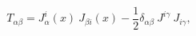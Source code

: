 \begin{equation}
T_{\alpha \beta} = J_{\alpha}^{i}(x)~J_{\beta i}(x)-\frac{1}{2} \delta_{\alpha \beta}~J^{i
\gamma}~J_{i \gamma},
\end{equation}

